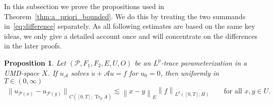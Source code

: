 \documentclass[reqno,a4paper,final]{amsart}
\numberwithin{equation}{section}
\newtheorem{proposition}[lemma]{Proposition}
\theoremstyle{definition}
\begin{document}
	In this subsection we prove the propositions used in Theorem~\ref{thm:a_priori_bounded}. We do this by treating the two summands in~\eqref{eq:difference} separately. As all following estimates are based on the same key ideas, we only give a detailed account once and will concentrate on the differences in the later proofs.
	
	\begin{proposition}\label{prop:linfty_inhomogenity}
		Let $(\mathcal{P}, F_1 , F_2, E, U, O)$ be an $L^p$-trace parameterization in a UMD-space $X$. If $u_{\mathcal{A}}$ solves $\dot{u} + \mathcal{A}u = f$ for $u_0 = 0$, then uniformly in $T \in (0, \infty)$
			\begin{align*}
				{\lVert{u_{\mathcal{P}(x)} - u_{\mathcal{P}(y)}}\rVert}_{C([0,T];\operatorname{Tr}_p A)} \lesssim {\left\lVert{x-y}\right\rVert}_E {\left\lVert{f}\right\rVert}_{L^p([0,T];H)} \qquad \text{for all } x,y \in U.
			\end{align*} 
	\end{proposition}
\end{document}
